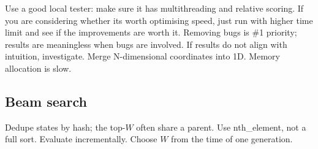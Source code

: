 	Use a good local tester: make sure it has multithreading and relative scoring.
	If you are considering whether its worth optimising speed, just run with higher time limit and see if the improvements are worth it.
	Removing bugs is \#1 priority; results are meaningless when bugs are involved. 
	If results do not align with intuition, investigate.
	Merge N-dimensional coordinates into 1D.
	Memory allocation is slow.
	\subsection{Beam search}
	Dedupe states by hash; the top-$W$ often share a parent. Use nth\_element, not a full sort. Evaluate incrementally. Choose $W$ from the time of one generation.

